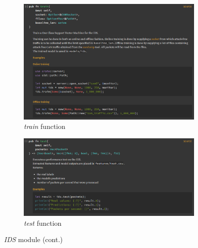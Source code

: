 \begin{figure}
    \ContinuedFloat
    \begin{subfigure}[b]{\linewidth}
        \includegraphics[width = \linewidth]{img/parts/docs/ids/ids_struct_train.png}
        \caption{\emph{train} function}
        \label{subfig:doc_ids_stuct_train}
    \end{subfigure}
    \begin{subfigure}[b]{\linewidth}
        \includegraphics[width = \linewidth]{img/parts/docs/ids/ids_struct_test.png}
        \caption{\emph{test} function}
        \label{subfig:doc_ids_stuct_test}
    \end{subfigure}
    \caption{\emph{IDS} module (cont.)}
    \label{fig:doc_ids}
\end{figure}
